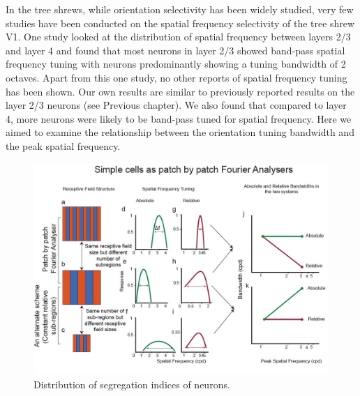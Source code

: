 	In the tree shrews, while orientation selectivity has been widely studied, very few studies have been conducted on the spatial frequency selectivity of the tree shrew V1. One study looked at the distribution of spatial frequency between layers 2/3 and layer 4 and found that most neurons in layer 2/3 showed band-pass spatial frequency tuning with neurons predominantly showing a tuning bandwidth of 2 octaves. Apart from this one study, no other reports of spatial frequency tuning has been shown. Our own results are similar to previously reported results on the layer 2/3 neurons (see Previous chapter). We also found that compared to layer 4, more neurons were likely to be band-pass tuned for spatial frequency. Here we aimed to examine the relationship between the orientation tuning bandwidth and the peak spatial frequency.
	
	\begin{figure}[H]
		
		\includegraphics[width=\linewidth]{LinearV1/scheme.jpg}
		\caption{Distribution of segregation indices of neurons.}
		\label{fig:fig1}
	\end{figure}

